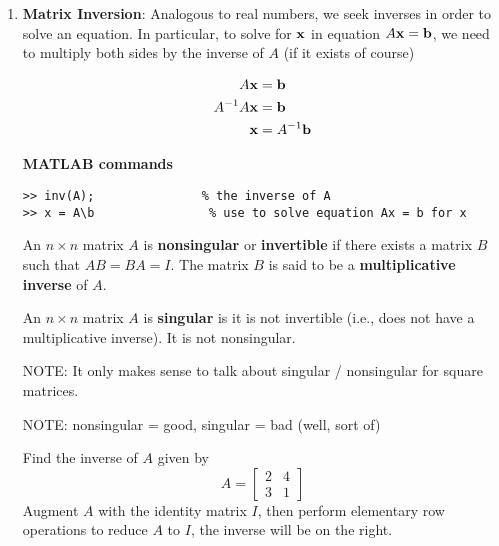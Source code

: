 \begin{enumerate}
 

\rule[0.01in]{\textwidth}{0.0025in}








\item \textbf{Matrix Inversion}: Analogous to real numbers, we seek inverses in order to solve an equation.  In particular, to solve for ${\bf x}$ in equation $A {\bf x} = {\bf b}$, we need to multiply both sides by the inverse of $A$ (if it exists of course)

\begin{align*}
	A {\bf x} &= {\bf b} \\
	 A^{-1} A {\bf x} &= {\bf b} \\
	  {\bf x} &= A^{-1} {\bf b}
\end{align*}



\textbf{MATLAB commands}
\begin{verbatim}
>> inv(A); 		         % the inverse of A
>> x = A\b		          % use to solve equation Ax = b for x
\end{verbatim}
\vspace{0.2cm}


\begin{definition}
	An $n \times n$ matrix $A$ is \textbf{nonsingular} or \textbf{invertible} if there exists a matrix $B$ such that $AB = BA = I$.  The matrix $B$ is said to be a \textbf{multiplicative inverse} of $A$.
\end{definition}

\vspace{0.2cm}

\begin{definition}
	An $n \times n$ matrix $A$ is \textbf{singular} is it is not invertible (i.e., does not have a multiplicative inverse).  It is not nonsingular.
\end{definition}
\vspace{0.2cm}

NOTE: It only makes sense to talk about singular / nonsingular for square matrices.  

NOTE: nonsingular = good, singular = bad  (well, sort of)



\begin{example}
Find the inverse of $A$ given by
\[ A = \begin{bmatrix} 2 & 4 \\ 3 & 1  \end{bmatrix} \]
Augment $A$ with the identity matrix $I$, then perform elementary row operations to reduce $A$ to $I$, the inverse will be on the right.


\end{example}
\end{enumerate}
